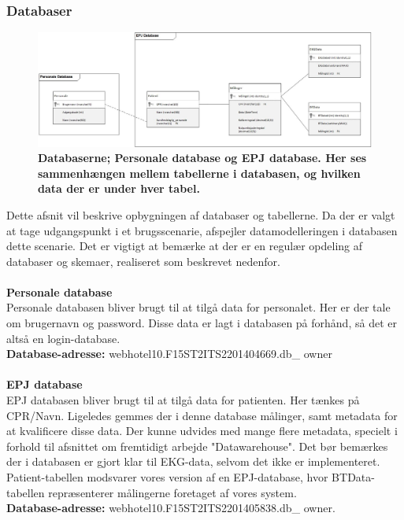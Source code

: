 \subsubsection{Databaser}
\begin{figure}[H]
\includegraphics[width =1.0\textwidth , center]{billeder/databaser}
\caption{\textbf{Databaserne; Personale database og EPJ database. Her ses sammenhængen mellem tabellerne i databasen, og hvilken data der er under hver tabel.}}
\end{figure}
Dette afsnit vil beskrive opbygningen af databaser og tabellerne. Da der er valgt at tage udgangspunkt i et brugsscenarie, afspejler datamodelleringen i databasen dette scenarie. Det er vigtigt at bemærke at der er en regulær opdeling af databaser og skemaer, realiseret som beskrevet nedenfor.
\\\\
\textbf{Personale database}\\
Personale databasen bliver brugt til at tilgå data for personalet. Her er der tale om brugernavn og password. Disse data er lagt i databasen på forhånd, så det er altså en login-database.\\ 
\textbf{Database-adresse:} webhotel10.F15ST2ITS2201404669.db\_ owner
\\\\
\textbf{EPJ database}\\
EPJ databasen bliver brugt til at tilgå data for patienten. Her tænkes på CPR/Navn. Ligeledes gemmes der i denne database målinger, samt metadata for at kvalificere disse data. Der kunne udvides med mange flere metadata, specielt i forhold til afsnittet om fremtidigt arbejde "Datawarehouse". Det bør bemærkes der i databasen er gjort klar til EKG-data, selvom det ikke er implementeret. Patient-tabellen modsvarer vores version af en EPJ-database, hvor BTData-tabellen repræsenterer målingerne foretaget af vores system.\\
\textbf{Database-adresse:} webhotel10.F15ST2ITS2201405838.db\_ owner. 
